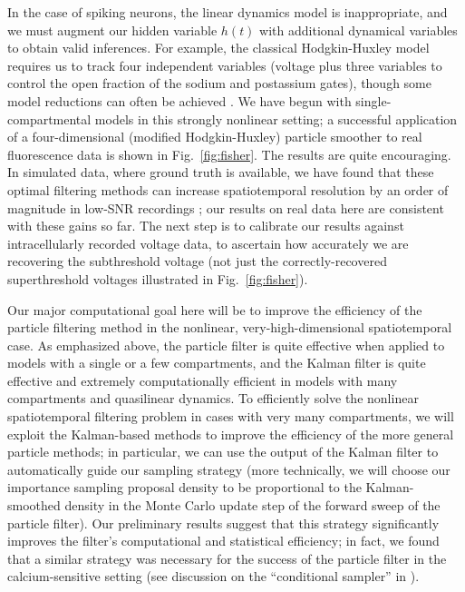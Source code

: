 \documentclass[12pt]{article}
\begin{document}
In the case of spiking neurons, the linear dynamics model is
inappropriate, and we must augment our hidden variable $h(t)$ with
additional dynamical variables to obtain valid inferences.  For
example, the classical Hodgkin-Huxley model requires us to track four
independent variables (voltage plus three variables to control the
open fraction of the sodium and postassium gates), though some model
reductions can often be achieved \cite{EK86,DA01}.  We have begun with
single-compartmental models in this strongly nonlinear setting; a
successful application of a four-dimensional (modified Hodgkin-Huxley)
particle smoother to real fluorescence data is shown in
Fig.~\ref{fig:fisher}.  The results are quite encouraging.  In
simulated data, where ground truth is available, we have found that
these optimal filtering methods can increase spatiotemporal resolution
by an order of magnitude in low-SNR recordings \cite{HP06}; our
results on real data here are consistent with these gains so far.  The
next step is to calibrate our results against intracellularly recorded
voltage data, to ascertain how accurately we are recovering the
subthreshold voltage (not just the correctly-recovered superthreshold
voltages illustrated in Fig.~\ref{fig:fisher}).

Our major computational goal here will be to improve the efficiency of
the particle filtering method in the nonlinear, very-high-dimensional
spatiotemporal case.  As emphasized above, the particle filter is
quite effective when applied to models with a single or a few
compartments, and the Kalman filter is quite effective and extremely
computationally efficient in models with many compartments and
quasilinear dynamics.  To efficiently solve the nonlinear
spatiotemporal filtering problem in cases with very many compartments,
we will exploit the Kalman-based methods to improve the efficiency of
the more general particle methods; in particular, we can use the
output of the Kalman filter to automatically guide our sampling
strategy (more technically, we will choose our importance sampling
proposal density to be proportional to the Kalman-smoothed density in
the Monte Carlo update step of the forward sweep of the particle
filter).  Our preliminary results suggest that this strategy
significantly improves the filter's computational and statistical
efficiency; in fact, we found that a similar strategy was necessary
for the success of the particle filter in the calcium-sensitive
setting (see discussion on the ``conditional sampler'' in
\cite{Vogelstein07}).
\end{document}
